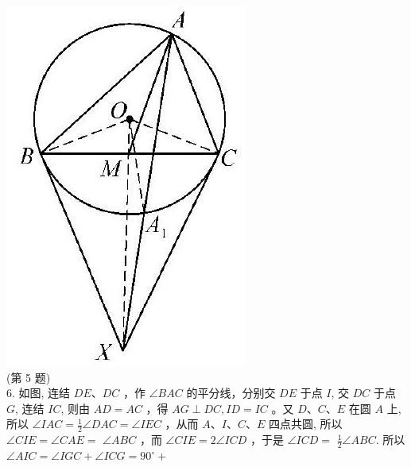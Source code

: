\documentclass[10pt]{article}
\begin{document}
\includegraphics[max width=\textwidth, center]{2024_10_30_66b8e5e701da2093c133g-105}\\
(第 5 题)\\
6. 如图, 连结 $D E 、 D C$ ，作 $\angle B A C$ 的平分线，分别交 $D E$ 于点 $I$, 交 $D C$ 于点 $G$, 连结 $I C$, 则由 $A D=A C$ ，得 $A G \perp D C, I D=I C$ 。又 $D 、 C 、 E$ 在圆 $A$ 上, 所以 $\angle I A C=\frac{1}{2} \angle D A C=\angle I E C$ ，从而 $A 、 I 、 C 、 E$ 四点共圆, 所以 $\angle C I E=\angle C A E=$ $\angle A B C$ ，而 $\angle C I E=2 \angle I C D$ ，于是 $\angle I C D=$ $\frac{1}{2} \angle A B C$. 所以 $\angle A I C=\angle I G C+\angle I C G=90^{\circ}+$\\
\end{document}
